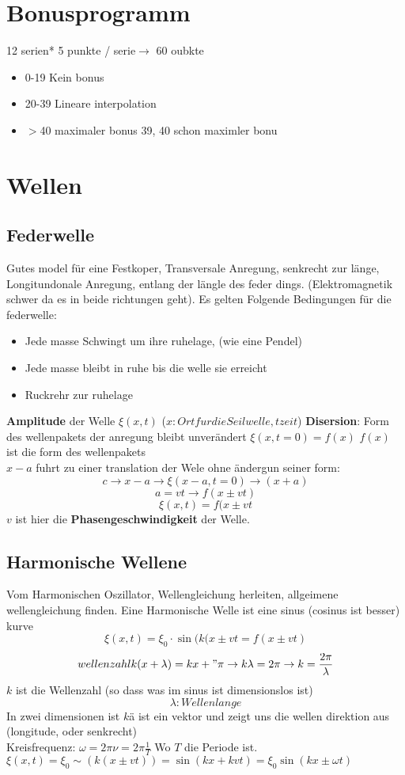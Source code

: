 \documentclass{article}
\author{Benjamin Dropmann}
\begin{document}
\section{Bonusprogramm}
12 serien* 5 punkte / serie$\rightarrow$ 60 oubkte\begin{itemize}
\item[\textbullet]{0-19 Kein bonus}
\item[\textbullet]{20-39 Lineare interpolation}
\item[\textbullet]{$>$40 maximaler bonus 39, 40 schon maximler bonu}
\end{itemize}
\section{Wellen}
\subsection{Federwelle} Gutes model für eine Festkoper, Transversale Anregung, senkrecht zur länge, Longitundonale Anregung, entlang der  längle des feder dings. (Elektromagnetik schwer da es in beide richtungen geht). Es gelten Folgende Bedingungen für die federwelle:
\begin{itemize}
\item[\textbullet]Jede masse Schwingt um ihre ruhelage, (wie eine Pendel)
\item[\textbullet]Jede masse bleibt in ruhe bis die welle sie erreicht
\item[\textbullet]Ruckrehr zur ruhelage
\end{itemize}
\textbf{Amplitude} der Welle $\xi(x,t)$ ($x : Ort fur die Seilwelle, t zeit$)
\textbf{Disersion}: Form des wellenpakets der anregung bleibt unverändert
$\xi(x,t=0)=f(x)$ $f(x)$ ist die form des wellenpakets\\$x-a$ fuhrt zu einer translation der Wele ohne ändergun seiner form:
\[c\rightarrow x-a\rightarrow \xi(x-a,t=0)\rightarrow (x+a)\]
\[a=vt \rightarrow f(x\pm vt)\]
\[\xi(x,t)=f(x\pm vt\] $v$ ist hier die \textbf{Phasengeschwindigkeit} der Welle.
\subsection{Harmonische Wellene} Vom Harmonischen Oszillator, Wellengleichung herleiten, allgeimene wellengleichung finden. Eine Harmonische Welle ist eine sinus (cosinus ist besser) kurve
\[\xi(x,t)=\xi_0\cdot\sin(k(x\pm vt=f(x\pm vt)\]
\[wellenzahlk(x+\lambda)=kx+"\pi \rightarrow k\lambda = 2\pi \rightarrow k=\frac{2\pi}{\lambda}\]
$k$ ist die Wellenzahl (so dass was im sinus ist dimensionslos ist)  \[\lambda:{Wellenlange}\]
In zwei dimensionen ist $k$ä ist ein vektor und zeigt uns die wellen direktion aus (longitude, oder senkrecht)
\\Kreisfrequenz: $\omega=2\pi\nu=2\pi\frac{1}{T}$ Wo $T$ die Periode ist.\\$\xi(x,t)=\xi_0\sim(k(x\pm vt))=\sin(kx+kvt)=\xi_0\sin(kx\pm\omega t)$
\end{document}
